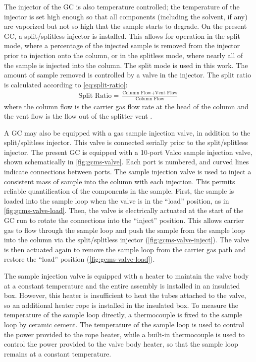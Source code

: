 \documentclass[../main.tex]{subfiles}
\begin{document}
The injector of the GC is also temperature controlled; the temperature of
the injector is set high enough so that all components (including the solvent,
if any) are vaporized but not so high that the sample starts to degrade. On the present GC,
a split/splitless injector is installed. This allows for operation in the
split mode, where a percentage of the injected sample is removed from the
injector prior to injection onto the column, or in the splitless mode,
where nearly all of the sample is injected into the column. The split mode
is used in this work. The amount of sample removed is controlled by a valve
in the injector. The split ratio is calculated according to \cref{eq:split-ratio}:
%
\begin{gather}
\label{eq:split-ratio}
\text{Split Ratio} = \frac{\text{Column Flow} +\text{Vent Flow}}{\text{Column Flow}}
\end{gather}
%
where the column flow is the carrier gas flow rate at the head of the column
and the vent flow is the flow out of the splitter vent \cite{Sparkman2011a}.

A GC may also be equipped with a gas sample injection valve, in addition to the
split/splitless injector. This valve is connected serially prior to the
split/splitless injector. The present GC is equipped with a 10-port Valco sample
injection valve, shown schematically in \cref{fig:gcms-valve}.
Each port is numbered, and curved lines indicate connections between ports.
The sample injection valve is used to inject a consistent mass of sample into the column
with each injection. This permits reliable quantification of the
components in the sample. First, the sample is loaded into the sample loop
when the valve is in the ``load'' position, as in \cref{fig:gcms-valve-load}.
Then, the valve is electrically actuated at the start of the
GC run to rotate the connections into the
``inject'' position. This allows carrier gas to flow through the sample loop and push
the sample from the sample loop into the column via the split/splitless injector (\cref{fig:gcms-valve-inject}).
The valve is then actuated again to remove the sample loop
from the carrier gas path and restore the ``load'' position (\cref{fig:gcms-valve-load}).

The sample injection valve is equipped with a heater to maintain
the valve body at a constant temperature and the entire assembly is installed
in an insulated box. However, this heater is insufficient
to heat the tubes attached to the valve, so an additional heater rope is installed
in the insulated box. To measure the temperature of the sample loop directly, a thermocouple
is fixed to the sample loop by ceramic cement. The temperature of the
sample loop is used to control the power provided to the rope heater,
while a built-in thermocouple is used to control the power provided
to the valve body heater, so that the sample loop remains at a constant temperature.
\end{document}
